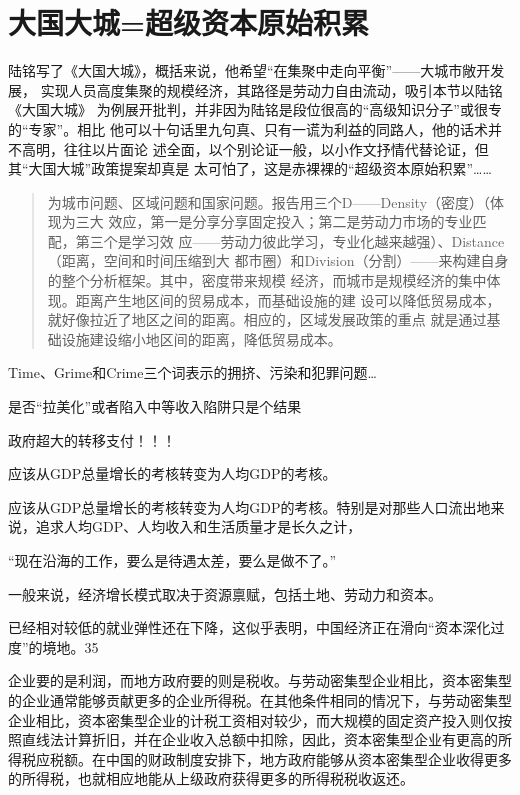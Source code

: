 \section{大国大城=超级资本原始积累}

陆铭写了《大国大城》，概括来说，他希望“在集聚中走向平衡”——大城市敞开发展，
实现人员高度集聚的规模经济，其路径是劳动力自由流动，吸引本节以陆铭《大国大城》
为例展开批判，并非因为陆铭是段位很高的“高级知识分子”或很专的“专家”。相比
他可以十句话里九句真、只有一谎为利益的同路人，他的话术并不高明，往往以片面论
述全面，以个别论证一般，以小作文抒情代替论证，但其“大国大城”政策提案却真是
太可怕了，这是赤裸裸的“超级资本原始积累”……

\begin{quotation}
  为城市问题、区域问题和国家问题。报告用三个D——Density（密度）（体现为三大
  效应，第一是分享分享固定投入；第二是劳动力市场的专业匹配，第三个是学习效
  应——劳动力彼此学习，专业化越来越强）、Distance（距离，空间和时间压缩到大
  都市圈）和Division（分割）——来构建自身的整个分析框架。其中，密度带来规模
  经济，而城市是规模经济的集中体现。距离产生地区间的贸易成本，而基础设施的建
  设可以降低贸易成本，就好像拉近了地区之间的距离。相应的，区域发展政策的重点
  就是通过基础设施建设缩小地区间的距离，降低贸易成本。
\end{quotation}

Time、Grime和Crime三个词表示的拥挤、污染和犯罪问题…

是否“拉美化”或者陷入中等收入陷阱只是个结果

政府超大的转移支付！！！

应该从GDP总量增长的考核转变为人均GDP的考核。


应该从GDP总量增长的考核转变为人均GDP的考核。特别是对那些人口流出地来说，追求人均GDP、人均收入和生活质量才是长久之计，

“现在沿海的工作，要么是待遇太差，要么是做不了。”

一般来说，经济增长模式取决于资源禀赋，包括土地、劳动力和资本。

已经相对较低的就业弹性还在下降，这似乎表明，中国经济正在滑向“资本深化过度”的境地。35

企业要的是利润，而地方政府要的则是税收。与劳动密集型企业相比，资本密集型的企业通常能够贡献更多的企业所得税。在其他条件相同的情况下，与劳动密集型企业相比，资本密集型企业的计税工资相对较少，而大规模的固定资产投入则仅按照直线法计算折旧，并在企业收入总额中扣除，因此，资本密集型企业有更高的所得税应税额。在中国的财政制度安排下，地方政府能够从资本密集型企业收得更多的所得税，也就相应地能从上级政府获得更多的所得税税收返还。


